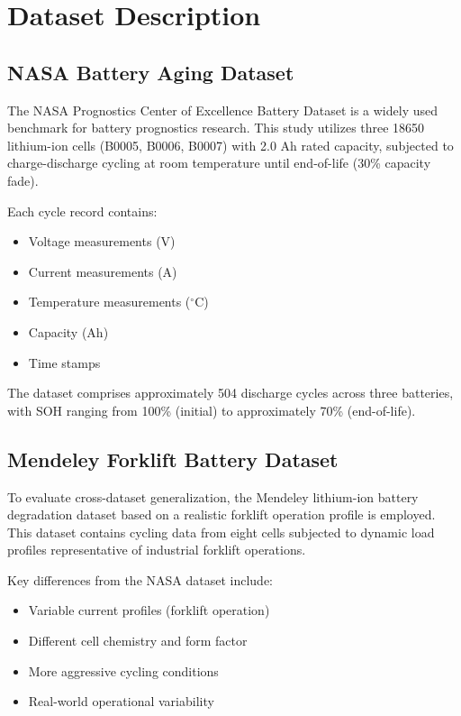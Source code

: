 \documentclass[conference]{IEEEtran}
\begin{document}
\section{Dataset Description}

\subsection{NASA Battery Aging Dataset}

The NASA Prognostics Center of Excellence Battery Dataset \cite{saxena2008} is a widely used benchmark for battery prognostics research. This study utilizes three 18650 lithium-ion cells (B0005, B0006, B0007) with 2.0 Ah rated capacity, subjected to charge-discharge cycling at room temperature until end-of-life (30\% capacity fade).

Each cycle record contains:
\begin{itemize}
    \item Voltage measurements (V)
    \item Current measurements (A)
    \item Temperature measurements ($^\circ$C)
    \item Capacity (Ah)
    \item Time stamps
\end{itemize}

The dataset comprises approximately 504 discharge cycles across three batteries, with SOH ranging from 100\% (initial) to approximately 70\% (end-of-life).

\subsection{Mendeley Forklift Battery Dataset}

To evaluate cross-dataset generalization, the Mendeley lithium-ion battery degradation dataset based on a realistic forklift operation profile is employed. This dataset contains cycling data from eight cells subjected to dynamic load profiles representative of industrial forklift operations.

Key differences from the NASA dataset include:
\begin{itemize}
    \item Variable current profiles (forklift operation)
    \item Different cell chemistry and form factor
    \item More aggressive cycling conditions
    \item Real-world operational variability
\end{itemize}
\end{document}

